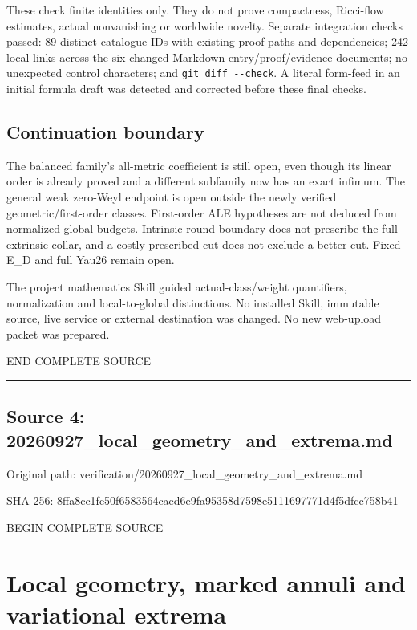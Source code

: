 \documentclass[
  10pt,
]{article}
\begin{document}
These check finite identities only. They do not prove compactness,
Ricci-flow estimates, actual nonvanishing or worldwide novelty. Separate
integration checks passed: 89 distinct catalogue IDs with existing proof
paths and dependencies; 242 local links across the six changed Markdown
entry/proof/evidence documents; no unexpected control characters; and
\texttt{git\ diff\ -\/-check}. A literal form-feed in an initial formula
draft was detected and corrected before these final checks.

\hypertarget{continuation-boundary-1}{%
\subsection{Continuation boundary}\label{continuation-boundary-1}}

The balanced family's all-metric coefficient is still open, even though
its linear order is already proved and a different subfamily now has an
exact infimum. The general weak zero-Weyl endpoint is open outside the
newly verified geometric/first-order classes. First-order ALE hypotheses
are not deduced from normalized global budgets. Intrinsic round boundary
does not prescribe the full extrinsic collar, and a costly prescribed
cut does not exclude a better cut. Fixed E\_D and full Yau26 remain
open.

The project mathematics Skill guided actual-class/weight quantifiers,
normalization and local-to-global distinctions. No installed Skill,
immutable source, live service or external destination was changed. No
new web-upload packet was prepared.

END COMPLETE SOURCE

\begin{center}\rule{0.5\linewidth}{0.5pt}\end{center}

\hypertarget{source-4-20260927_local_geometry_and_extrema.md}{%
\subsection{Source 4:
20260927\_local\_geometry\_and\_extrema.md}\label{source-4-20260927_local_geometry_and_extrema.md}}

Original path: verification/20260927\_local\_geometry\_and\_extrema.md

SHA-256:
8ffa8cc1fe50f6583564caed6e9fa95358d7598e5111697771d4f5dfcc758b41

BEGIN COMPLETE SOURCE

\hypertarget{local-geometry-marked-annuli-and-variational-extrema}{%
\section{Local geometry, marked annuli and variational
extrema}\label{local-geometry-marked-annuli-and-variational-extrema}}
\end{document}
